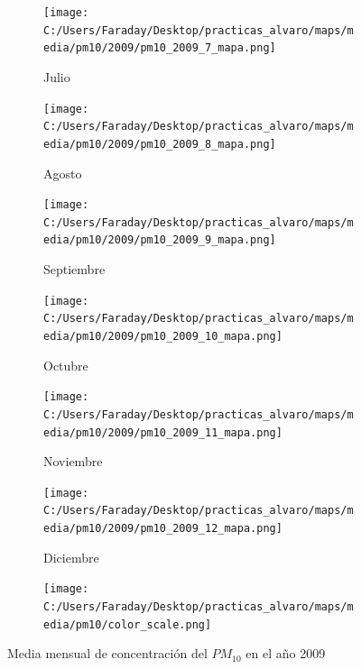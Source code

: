 \documentclass[12pt]{article}
\begin{document}
\begin{figure}[H]
\begin{subfigure}[H]{0.15\textwidth}
\texttt{[image: C:/Users/Faraday/Desktop/practicas\_alvaro/maps/media/pm10/2009/pm10\_2009\_7\_mapa.png]}
\captionsetup{labelformat=empty}
\caption{Julio}
\label{fig:map-pm10-2009-7}
\end{subfigure}
%
\begin{subfigure}[H]{0.15\textwidth}
\texttt{[image: C:/Users/Faraday/Desktop/practicas\_alvaro/maps/media/pm10/2009/pm10\_2009\_8\_mapa.png]}
\captionsetup{labelformat=empty}
\caption{Agosto}
\label{fig:map-pm10-2009-8}
\end{subfigure}
%
\begin{subfigure}[H]{0.15\textwidth}
\texttt{[image: C:/Users/Faraday/Desktop/practicas\_alvaro/maps/media/pm10/2009/pm10\_2009\_9\_mapa.png]}
\captionsetup{labelformat=empty}
\caption{Septiembre}
\label{fig:map-pm10-2009-9}
\end{subfigure}
%
\begin{subfigure}[H]{0.15\textwidth}
\texttt{[image: C:/Users/Faraday/Desktop/practicas\_alvaro/maps/media/pm10/2009/pm10\_2009\_10\_mapa.png]}
\captionsetup{labelformat=empty}
\caption{Octubre}
\label{fig:map-pm10-2009-10}
\end{subfigure}
%
\begin{subfigure}[H]{0.15\textwidth}
\texttt{[image: C:/Users/Faraday/Desktop/practicas\_alvaro/maps/media/pm10/2009/pm10\_2009\_11\_mapa.png]}
\captionsetup{labelformat=empty}
\caption{Noviembre}
\label{fig:map-pm10-2009-11}
\end{subfigure}
%
\begin{subfigure}[H]{0.15\textwidth}
\texttt{[image: C:/Users/Faraday/Desktop/practicas\_alvaro/maps/media/pm10/2009/pm10\_2009\_12\_mapa.png]}
\captionsetup{labelformat=empty}
\caption{Diciembre}
\label{fig:map-pm10-2009-12}
\end{subfigure}

\begin{subfigure}[H]{0.45\textwidth}
\texttt{[image: C:/Users/Faraday/Desktop/practicas\_alvaro/maps/media/pm10/color\_scale.png]}
\captionsetup{labelformat=empty}
\caption{}
\end{subfigure}

\vspace*{-7mm}
\caption{Media mensual de concentración del $PM_{10}$ en el año 2009}
\label{fig:map-pm10-2009}
\end{figure}
\end{document}
